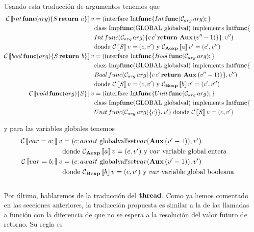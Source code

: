 Usando esta traducción de argumentos tenemos que
\begin{align*}
  \mathcal{C}\left\llbracket int\,\textbf{func}(arg)\{S\,\textbf{return } a\} \right\rrbracket v &= (\mbox{interface Int$\textbf{func}$}\{
  \mbox{$Int\, \textbf{func}(\mathcal{C}_{arg}\,arg)\mbox{;\,}$}\}\\
  & \mbox{class Imp$\textbf{func}($GLOBAL globalval$)$ implements Int$\textbf{func}\{$}\\
  & Int\, func(\mathcal{C}_{arg}\,arg) \{ c\,c'\,\textbf{return } \textbf{Aux}\, (v'' - 1)\}\} , v'')\\
  & \mbox{donde $\mathcal{C}\left\llbracket S \right\rrbracket v = (c, v')$ y } \mathcal{C}_{\textbf{Aexp}}\left\llbracket a \right\rrbracket v' = (c', v'')\\
  \mathcal{C}\left\llbracket bool\,\textbf{func}(arg)\{S\,\textbf{return } b\} \right\rrbracket v &= (\mbox{interface Int$\textbf{func}$}\{
  \mbox{$Bool\, \textbf{func}(\mathcal{C}_{arg}\,arg)\mbox{;\,}$}\}\\
  & \mbox{class Imp$\textbf{func}($GLOBAL globalval$)$ implements Int$\textbf{func}\{$}\\
  & Bool\, func(\mathcal{C}_{arg}\,arg) \{ c\,c'\,\textbf{return } \textbf{Aux}\, (v'' - 1)\}\} , v'')\\
  & \mbox{donde $\mathcal{C}\left\llbracket S \right\rrbracket v = (c, v')$ y } \mathcal{C}_{\textbf{Bexp}}\left\llbracket b \right\rrbracket v' = (c', v'')\\
  \mathcal{C}\left\llbracket void\,\textbf{func}(arg)\{S\} \right\rrbracket v &= (\mbox{interface Int$\textbf{func}$}\{
  \mbox{$Unit\, \textbf{func}(\mathcal{C}_{arg}\,arg)\mbox{;\,}$}\}\\
  & \mbox{class Imp$\textbf{func}($GLOBAL globalval$)$ implements Int$\textbf{func}\{$}\\
  & Unit\, func(\mathcal{C}_{arg}\,arg) \{ c \}\} , v')
  \mbox{ donde $\mathcal{C}\left\llbracket S \right\rrbracket v = (c, v')$}
\end{align*}

y para las variables globales tenemos
\begin{align*} %
  \C\eval{var = a\;} v &= (c\; await \mbox{ globalval!set}var(\Aux\, (v' - 1)), v') \\
  & \mbox{donde $\C_\AExp\eval{a} v = (c, v')$ y $var$ variable global entera} \\
  \C\eval{var = b\;} v &= (c\; await \mbox{ globalval!set}var(\Aux\, (v' - 1)), v') \\
  & \mbox{donde $\C_\BExp\eval{b} v = (c, v')$ y $var$ variable global booleana}
\end{align*}\\

Por último, hablaremos de la traducción del $\textbf{thread}$. Como ya hemos comentado en las secciones anteriores, la traducción propuesta es similar a la de las llamadas a función con la diferencia de que no se espera a la resolución del valor futuro de retorno. Su regla es

